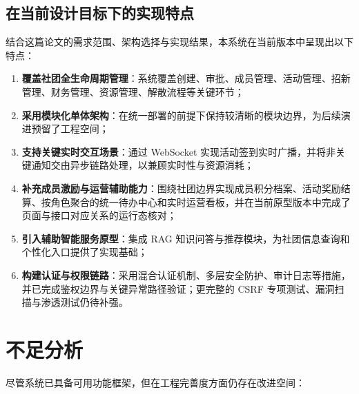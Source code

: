 \subsection{在当前设计目标下的实现特点}

结合这篇论文的需求范围、架构选择与实现结果，本系统在当前版本中呈现出以下特点：

\begin{enumerate}
  \item \textbf{覆盖社团全生命周期管理}：系统覆盖创建、审批、成员管理、活动管理、招新管理、财务管理、资源管理、解散流程等关键环节；

  \item \textbf{采用模块化单体架构}：在统一部署的前提下保持较清晰的模块边界，为后续演进预留了工程空间；

  \item \textbf{支持关键实时交互场景}：通过 WebSocket 实现活动签到实时广播，并将非关键通知交由异步链路处理，以兼顾实时性与资源消耗；

  \item \textbf{补充成员激励与运营辅助能力}：围绕社团边界实现成员积分档案、活动奖励结算、按角色聚合的统一待办中心和实时运营看板，并在当前原型版本中完成了页面与接口对应关系的运行态核对；

  \item \textbf{引入辅助智能服务原型}：集成 RAG 知识问答与推荐模块，为社团信息查询和个性化入口提供了实现基础；

  \item \textbf{构建认证与权限链路}：采用混合认证机制、多层安全防护、审计日志等措施，并已完成鉴权边界与关键异常路径验证；更完整的 CSRF 专项测试、漏洞扫描与渗透测试仍待补强。
\end{enumerate}

\section{不足分析}

尽管系统已具备可用功能框架，但在工程完善度方面仍存在改进空间：

